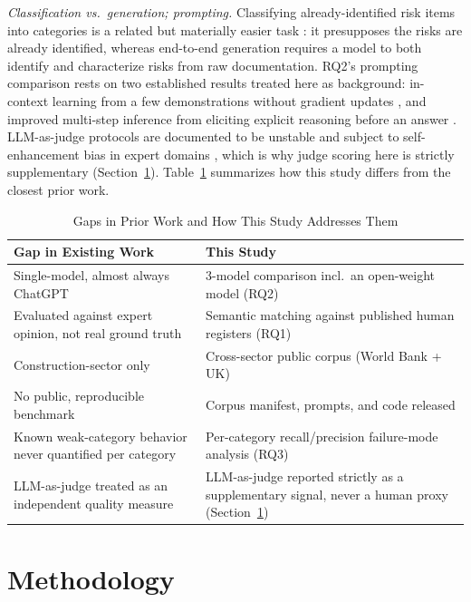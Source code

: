 \documentclass[10pt, conference, letterpaper]{IEEEtran}
\begin{document}
\textit{Classification vs.\ generation; prompting.} Classifying
already-identified risk items into categories is a related but materially
easier task \cite{buildings2025risk_classification,textmining2025scrm}: it
presupposes the risks are already identified, whereas end-to-end generation
requires a model to both identify and characterize risks from raw
documentation. RQ2's prompting comparison rests on two established results
treated here as background: in-context learning from a few demonstrations
without gradient updates \cite{brown2020fewshot}, and improved multi-step
inference from eliciting explicit reasoning before an answer
\cite{wei2022cot}. LLM-as-judge protocols are documented to be unstable and
subject to self-enhancement bias in expert domains
\cite{zheng2023judging_llm_judge,iui2025llmjudge_expert,nofreelabels2025,llmsasjudges2024survey},
which is why judge scoring here is strictly supplementary
(Section~\ref{sec:methods}). Table~\ref{tab:gap} summarizes how this study
differs from the closest prior work.

\begin{table}[t]
\caption{Gaps in Prior Work and How This Study Addresses Them}
\label{tab:gap}
\small
\begin{tabular}{@{}p{}p{}@{}}
\toprule
\textbf{Gap in Existing Work} & \textbf{This Study} \\
\midrule
Single-model, almost always ChatGPT & 3-model comparison incl.\ an open-weight model (RQ2) \\
Evaluated against expert opinion, not real ground truth & Semantic matching against published human registers (RQ1) \\
Construction-sector only & Cross-sector public corpus (World Bank + UK) \\
No public, reproducible benchmark & Corpus manifest, prompts, and code released \\
Known weak-category behavior never quantified per category & Per-category recall/precision failure-mode analysis (RQ3) \\
LLM-as-judge treated as an independent quality measure & LLM-as-judge reported strictly as a supplementary signal, never a human proxy (Section~\ref{sec:methods}) \\
\bottomrule
\end{tabular}
\end{table}

\section{Methodology}
\label{sec:methods}
\end{document}

